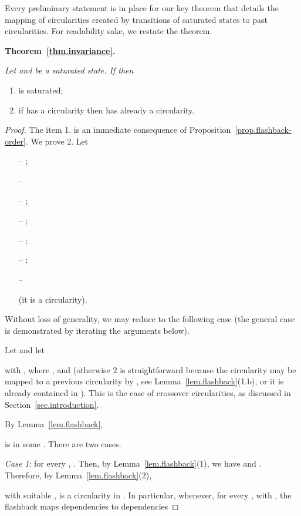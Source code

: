 Every preliminary statement is in place for our key theorem that details the mapping
of circularities created by transitions of saturated states to past circularities.
For readability sake, we restate the theorem.

\bigskip

\noindent
{\bf Theorem~\ref{thm.invariance}.} {\em
Let  
and
 be a saturated state.
If
 then
\begin{enumerate}
\item
 is saturated;
\item
if  has a circularity then  has already 
a circularity.
\end{enumerate}
}


\begin{proof}
The item 1. is an immediate consequence of Proposition~\ref{prop.flashback-order}.
We prove 2.  
Let
\begin{itemize}
\item[--]
;
 
\item[--]


\item[--]
; 

\item[--]
;

\item[--]
;

\item[--]
;

\item[--]
 
 (it is a circularity).
\end{itemize}
Without loss of generality, we may reduce to the following case (the general case
is demonstrated by iterating the arguments below).

Let  and let 
 
with , where , and 
(otherwise 2 is straightforward because the circularity may be mapped
to a previous circularity by , see Lemma~\ref{lem.flashback}(1.b), or it
is already contained in ). This is the case of crossover circularities, as discussed in Section~\ref{sec.introduction}.

By Lemma~\ref{lem.flashback}, 

is in some . There are two cases.

\emph{Case 1}: for every , 
. Then, by 
Lemma~\ref{lem.flashback}(1), we have  and 
. Therefore, by 
Lemma~\ref{lem.flashback}(2), 
 
with suitable , 
is a circularity in . In particular, 
whenever, for every ,  
with , the flashback 
 maps dependencies  to 
dependencies 


\end{proof}
